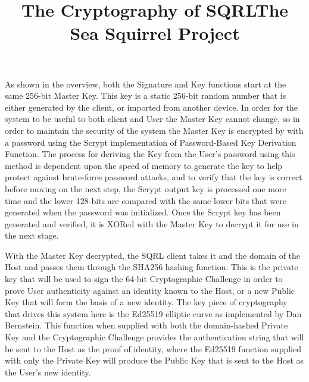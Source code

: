 \documentclass[12pt,twoside]{article}
\begin{document}
\title{\textbf{The Cryptography of SQRL}}

As shown in the overview, both the Signature and Key functions start at the same 256-bit Master Key. This key is a static 256-bit random number that is either generated by the client, or imported from another device. In order for the system to be useful to both client and User the Master Key cannot change, so in order to maintain the security of the system the Master Key is encrypted by with a password using the Scrypt implementation of Password-Based Key Derivation Function. The process for deriving the Key from the User's password using this method is dependent upon the speed of memory to generate the key to help protect against brute-force password attacks, and to verify that the key is correct before moving on the next step, the Scrypt output key is processed one more time and the lower 128-bits are compared with the same lower bits that were generated when the password was initialized. Once the Scrypt key has been generated and verified, it is XORed with the Master Key to decrypt it for use in the next stage.

With the Master Key decrypted, the SQRL client takes it and the domain of the Host and passes them through the SHA256 hashing function. This is the private key that will be used to sign the 64-bit Cryptographic Challenge in order to prove User authenticity against an identity known to the Host, or a new Public Key that will form the basis of a new identity. The key piece of cryptography that drives this system here is the Ed25519 elliptic curve as implemented by Dan Bernstein. This function when supplied with both the domain-hashed Private Key and the Cryptographic Challenge provides the authentication string that will be sent to the Host as the proof of identity, where the Ed25519 function supplied with only the Private Key will produce the Public Key that is sent to the Host as the User's new identity.

\pagebreak

\title{\textbf{The Sea Squirrel Project}} 
\end{document}
